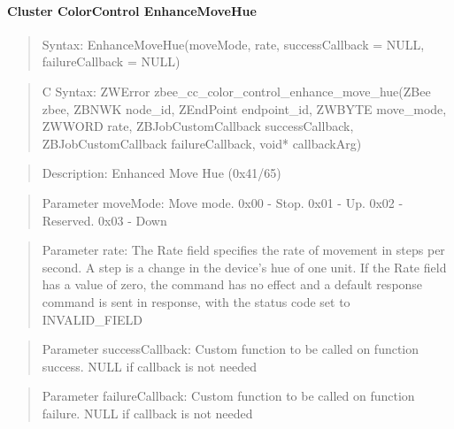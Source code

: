 \paragraph{Cluster ColorControl EnhanceMoveHue}
\begin{quote}Syntax: EnhanceMoveHue(moveMode, rate, successCallback = NULL, failureCallback = NULL)\end{quote}
\begin{quote}C Syntax: ZWError zbee\_cc\_color\_control\_enhance\_move\_hue(ZBee zbee, ZBNWK node\_id, ZEndPoint endpoint\_id, ZWBYTE move\_mode, ZWWORD rate, ZBJobCustomCallback successCallback, ZBJobCustomCallback failureCallback, void* callbackArg)\end{quote}
\begin{quote}Description: Enhanced Move Hue (0x41/65)\end{quote}
\begin{quote}Parameter moveMode: Move mode. 0x00 - Stop. 0x01 - Up. 0x02 - Reserved. 0x03 - Down\end{quote}
\begin{quote}Parameter rate: The Rate field specifies the rate of movement in steps per second. A step is a change in the device’s hue of one unit. If the Rate field has a value of zero, the command has no effect and a default response command is sent in response, with the status code set to INVALID\_FIELD\end{quote}
\begin{quote}Parameter successCallback: Custom function to be called on function success. NULL if callback is not needed\end{quote}
\begin{quote}Parameter failureCallback: Custom function to be called on function failure. NULL if callback is not needed\end{quote}


